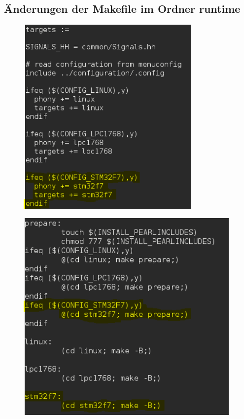 \subsection{Änderungen der Makefile im Ordner runtime}\label{Änderungen der Makefile im Ordner runtime}
\begin{figure}[h]
\begin{center}
\includegraphics[width=9cm]{grafiken/Makefile_runtime1.png}
\end{center}
\end{figure}
\clearpage
\begin{figure}[h]
\begin{center}
\includegraphics[width=11cm]{grafiken/Makefile_runtime2.png}
\end{center}
\end{figure}

